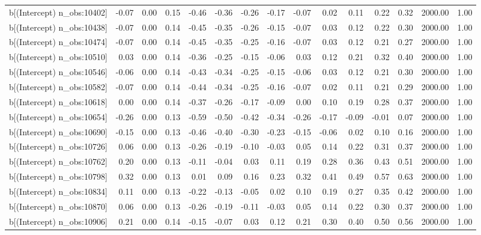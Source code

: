 \begin{table}[ht]
\begin{tabular}{rrrrrrrrrrrrrrr}
  b[(Intercept) n\_obs:10402] & -0.07 & 0.00 & 0.15 & -0.46 & -0.36 & -0.26 & -0.17 & -0.07 & 0.02 & 0.11 & 0.22 & 0.32 & 2000.00 & 1.00 \\ 
  b[(Intercept) n\_obs:10438] & -0.07 & 0.00 & 0.14 & -0.45 & -0.35 & -0.26 & -0.15 & -0.07 & 0.03 & 0.12 & 0.22 & 0.30 & 2000.00 & 1.00 \\ 
  b[(Intercept) n\_obs:10474] & -0.07 & 0.00 & 0.14 & -0.45 & -0.35 & -0.25 & -0.16 & -0.07 & 0.03 & 0.12 & 0.21 & 0.27 & 2000.00 & 1.00 \\ 
  b[(Intercept) n\_obs:10510] & 0.03 & 0.00 & 0.14 & -0.36 & -0.25 & -0.15 & -0.06 & 0.03 & 0.12 & 0.21 & 0.32 & 0.40 & 2000.00 & 1.00 \\ 
  b[(Intercept) n\_obs:10546] & -0.06 & 0.00 & 0.14 & -0.43 & -0.34 & -0.25 & -0.15 & -0.06 & 0.03 & 0.12 & 0.21 & 0.30 & 2000.00 & 1.00 \\ 
  b[(Intercept) n\_obs:10582] & -0.07 & 0.00 & 0.14 & -0.44 & -0.34 & -0.25 & -0.16 & -0.07 & 0.02 & 0.11 & 0.21 & 0.29 & 2000.00 & 1.00 \\ 
  b[(Intercept) n\_obs:10618] & 0.00 & 0.00 & 0.14 & -0.37 & -0.26 & -0.17 & -0.09 & 0.00 & 0.10 & 0.19 & 0.28 & 0.37 & 2000.00 & 1.00 \\ 
  b[(Intercept) n\_obs:10654] & -0.26 & 0.00 & 0.13 & -0.59 & -0.50 & -0.42 & -0.34 & -0.26 & -0.17 & -0.09 & -0.01 & 0.07 & 2000.00 & 1.00 \\ 
  b[(Intercept) n\_obs:10690] & -0.15 & 0.00 & 0.13 & -0.46 & -0.40 & -0.30 & -0.23 & -0.15 & -0.06 & 0.02 & 0.10 & 0.16 & 2000.00 & 1.00 \\ 
  b[(Intercept) n\_obs:10726] & 0.06 & 0.00 & 0.13 & -0.26 & -0.19 & -0.10 & -0.03 & 0.05 & 0.14 & 0.22 & 0.31 & 0.37 & 2000.00 & 1.00 \\ 
  b[(Intercept) n\_obs:10762] & 0.20 & 0.00 & 0.13 & -0.11 & -0.04 & 0.03 & 0.11 & 0.19 & 0.28 & 0.36 & 0.43 & 0.51 & 2000.00 & 1.00 \\ 
  b[(Intercept) n\_obs:10798] & 0.32 & 0.00 & 0.13 & 0.01 & 0.09 & 0.16 & 0.23 & 0.32 & 0.41 & 0.49 & 0.57 & 0.63 & 2000.00 & 1.00 \\ 
  b[(Intercept) n\_obs:10834] & 0.11 & 0.00 & 0.13 & -0.22 & -0.13 & -0.05 & 0.02 & 0.10 & 0.19 & 0.27 & 0.35 & 0.42 & 2000.00 & 1.00 \\ 
  b[(Intercept) n\_obs:10870] & 0.06 & 0.00 & 0.13 & -0.26 & -0.19 & -0.11 & -0.03 & 0.05 & 0.14 & 0.22 & 0.30 & 0.37 & 2000.00 & 1.00 \\ 
  b[(Intercept) n\_obs:10906] & 0.21 & 0.00 & 0.14 & -0.15 & -0.07 & 0.03 & 0.12 & 0.21 & 0.30 & 0.40 & 0.50 & 0.56 & 2000.00 & 1.00 \\ 

\end{tabular}
\end{table}
